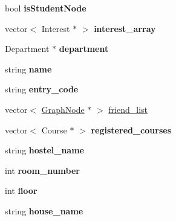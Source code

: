 \begin{DoxyCompactItemize}
\item 
\hypertarget{structGraphNode_ae493277ace9462fea94fb2ed464e07d3}{bool {\bfseries is\-Student\-Node}}\label{structGraphNode_ae493277ace9462fea94fb2ed464e07d3}

\item 
\hypertarget{structGraphNode_a6bc81d0ca9113f299d6288cb13bb1eb6}{vector$<$ \-Interest $\ast$ $>$ {\bfseries interest\-\_\-array}}\label{structGraphNode_a6bc81d0ca9113f299d6288cb13bb1eb6}

\item 
\hypertarget{structGraphNode_ae66114e67913dab0380fd25f26416ea9}{\-Department $\ast$ {\bfseries department}}\label{structGraphNode_ae66114e67913dab0380fd25f26416ea9}

\item 
\hypertarget{structGraphNode_ad9d6e2da5d509aa0900057163b14aef8}{string {\bfseries name}}\label{structGraphNode_ad9d6e2da5d509aa0900057163b14aef8}

\item 
\hypertarget{structGraphNode_a7ff607d39e5d42e3a28bddec68f6c5eb}{string {\bfseries entry\-\_\-code}}\label{structGraphNode_a7ff607d39e5d42e3a28bddec68f6c5eb}

\item 
vector$<$ \hyperlink{structGraphNode}{\-Graph\-Node} $\ast$ $>$ \hyperlink{structGraphNode_a3ffe69b1e0d4df5a623e9b4601e8ce01}{friend\-\_\-list}
\item 
\hypertarget{structGraphNode_aca37e5d9e6609bfb887323922911315d}{vector$<$ \-Course $\ast$ $>$ {\bfseries registered\-\_\-courses}}\label{structGraphNode_aca37e5d9e6609bfb887323922911315d}

\item 
\hypertarget{structGraphNode_a7d6b82688398c5b528c3d6a860e8af04}{string {\bfseries hostel\-\_\-name}}\label{structGraphNode_a7d6b82688398c5b528c3d6a860e8af04}

\item 
\hypertarget{structGraphNode_ac6137bd38f0d5d8710e6a234543f2e99}{int {\bfseries room\-\_\-number}}\label{structGraphNode_ac6137bd38f0d5d8710e6a234543f2e99}

\item 
\hypertarget{structGraphNode_aea1257d9488ad98906ab8d0c9e091af8}{int {\bfseries floor}}\label{structGraphNode_aea1257d9488ad98906ab8d0c9e091af8}

\item 
\hypertarget{structGraphNode_a6d1e993a0b118dcf44143fcd37772d2c}{string {\bfseries house\-\_\-name}}\label{structGraphNode_a6d1e993a0b118dcf44143fcd37772d2c}


\end{DoxyCompactItemize}
